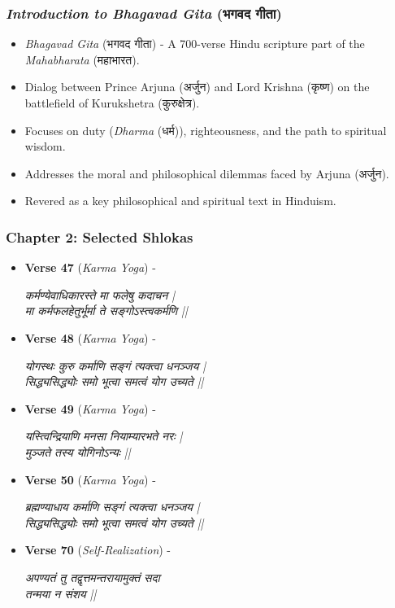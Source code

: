 \begin{frame}[fragile]\frametitle{\textit{Introduction to Bhagavad Gita} (भगवद गीता)}

      \begin{itemize}
		\item \textit{Bhagavad Gita} (भगवद गीता) - A 700-verse Hindu scripture part of the \textit{Mahabharata} (महाभारत).
		\item Dialog between Prince Arjuna (अर्जुन) and Lord Krishna (कृष्ण) on the battlefield of Kurukshetra (कुरुक्षेत्र).
		\item Focuses on duty (\textit{Dharma} (धर्म)), righteousness, and the path to spiritual wisdom.
		\item Addresses the moral and philosophical dilemmas faced by Arjuna (अर्जुन).
		\item Revered as a key philosophical and spiritual text in Hinduism.
	  \end{itemize}

\end{frame}

\begin{frame}[fragile]\frametitle{Chapter 2: Selected Shlokas}

      \begin{itemize}
		\item \textbf{Verse 47} (\textit{Karma Yoga}) - 
		
			\textit{कर्मण्येवाधिकारस्ते मा फलेषु कदाचन |} \\
			\textit{मा कर्मफलहेतुर्भूर्मा ते सङ्गोऽस्त्वकर्मणि ||}
		
		\item \textbf{Verse 48} (\textit{Karma Yoga}) - 
		
			\textit{योगस्थः कुरु कर्माणि सङ्गं त्यक्त्वा धनञ्जय |} \\
			\textit{सिद्ध्यसिद्ध्योः समो भूत्वा समत्वं योग उच्यते ||}
		
		\item \textbf{Verse 49} (\textit{Karma Yoga}) - 
		
			\textit{यस्त्विन्द्रियाणि मनसा नियाम्यारभते नरः |} \\
			\textit{मुञ्जते तस्य योगिनोऽन्यः ||}
		
		\item \textbf{Verse 50} (\textit{Karma Yoga}) - 
		
			\textit{ब्रह्मण्याधाय कर्माणि सङ्गं त्यक्त्वा धनञ्जय |} \\
			\textit{सिद्ध्यसिद्ध्योः समो भूत्वा समत्वं योग उच्यते ||}
		
		\item \textbf{Verse 70} (\textit{Self-Realization}) - 
		
			\textit{अपण्यतं तु तद्वृत्तमन्तरायामुक्तं सदा} \\
			\textit{तन्मया न संशय ||}
		
	  \end{itemize}

\end{frame}


